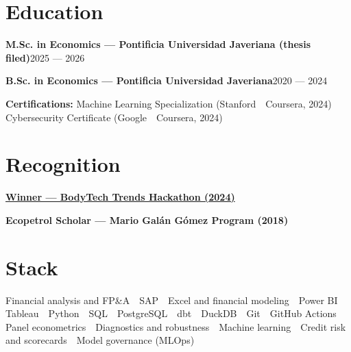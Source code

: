 \documentclass[a4paper,10pt]{article}
\newcommand{\row}[2]{\textbf{\color{ink}#1}\hfill{\small #2}\par}
\begin{document}
\section*{Education}
\row{M.Sc. in Economics \textnormal{---} Pontificia Universidad Javeriana \textnormal{(thesis filed)}}{2025 --- 2026}
\row{B.Sc. in Economics \textnormal{---} Pontificia Universidad Javeriana}{2020 --- 2024}
{\small\textbf{\color{ink}Certifications:} Machine Learning Specialization (Stanford \,\textperiodcentered\, Coursera, 2024) \,\textperiodcentered\, Cybersecurity Certificate (Google \,\textperiodcentered\, Coursera, 2024)}\par

\section*{Recognition}
\row{\href{https://public.tableau.com/app/profile/davirson.novoa/viz/BodyTrendsADataAnalysisProject/TrendsAnalysis}{Winner --- BodyTech Trends Hackathon \textnormal{(2024)}}}{}
\row{Ecopetrol Scholar --- Mario Galán Gómez Program \textnormal{(2018)}}{}

\section*{Stack}
Financial analysis and FP\&A \,\textperiodcentered\, SAP \,\textperiodcentered\, Excel and financial modeling \,\textperiodcentered\, Power BI \,\textperiodcentered\, Tableau \,\textperiodcentered\, Python \,\textperiodcentered\, SQL \,\textperiodcentered\, PostgreSQL \,\textperiodcentered\, dbt \,\textperiodcentered\, DuckDB \,\textperiodcentered\, Git \,\textperiodcentered\, GitHub Actions \,\textperiodcentered\, Panel econometrics \,\textperiodcentered\, Diagnostics and robustness \,\textperiodcentered\, Machine learning \,\textperiodcentered\, Credit risk and scorecards \,\textperiodcentered\, Model governance (MLOps)
\end{document}
